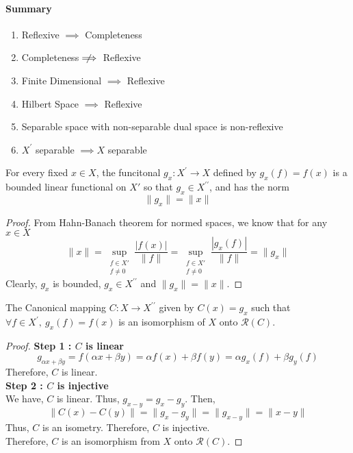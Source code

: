 \begin{commentary}
\paragraph{Summary}
\begin{enumerate}
	\item Reflexive $\implies$ Completeness
	\item Completeness $\;\not\nobreak\!\!\!\!\implies$ Reflexive
	\item Finite Dimensional $\implies$ Reflexive
	\item Hilbert Space $\implies$ Reflexive
	\item Separable space with non-separable dual space is non-reflexive
	\item $X^\prime$ separable $\implies X$ separable
\end{enumerate}
\end{commentary}

\begin{lemma}
	For every fixed $x \in X$, the funcitonal $g_x : X^\prime \to X$ defined by $g_x(f) = f(x)$ is a bounded linear functional on $X'$ so that $g_x \in X^{\prime\prime}$, and has the norm
	\[ \|g_x\| = \|x\| \]
\end{lemma}
\begin{proof}
	From Hahn-Banach theorem for normed spaces, we know that for any $x \in X$
	\begin{equation}
		\|x\|  = \sup_{\substack{f \in X'\\ f \ne 0}} \frac{|f(x)|}{\|f\|}  =  \sup_{\substack{f \in X' \\ f \ne 0}} \frac{|g_x(f)|}{\|f\|} = \|g_x\| 
	\end{equation}
	Clearly, $g_x$ is bounded, $g_x \in X^{\prime\prime}$ and $\|g_x\| = \|x\|$.
\end{proof}

\begin{lemma}
	The Canonical mapping $C : X \to X^{\prime\prime}$ given by $C(x) = g_x$ such that $\forall f \in X^\prime,\ g_x(f) = f(x)$ is an isomorphism of $X$ onto $\mathscr{R}(C)$.
\end{lemma}
\begin{proof}
	\textbf{Step 1 : $C$ is linear}
	\begin{equation}
	g_{\alpha x + \beta y} = f(\alpha x + \beta y) = \alpha f(x) + \beta f(y) = \alpha g_x(f) + \beta g_y(f)
	\end{equation}
	\indent Therefore, $C$ is linear.\\

	\textbf{Step 2 : $C$ is injective}\\
	\indent We have, $C$ is linear.
	Thus, $g_{x-y} = g_x - g_y$.
	Then,
	\begin{equation}	
		\| C(x) - C(y) \| = \| g_x - g_y \| = \|g_{x-y}\| = \|x-y\|
	\end{equation}
	\indent Thus, $C$ is an isometry.
	Therefore, $C$ is injective.\\

	Therefore, $C$ is an isomorphism from $X$ onto $\mathscr{R}(C)$.
\end{proof}

